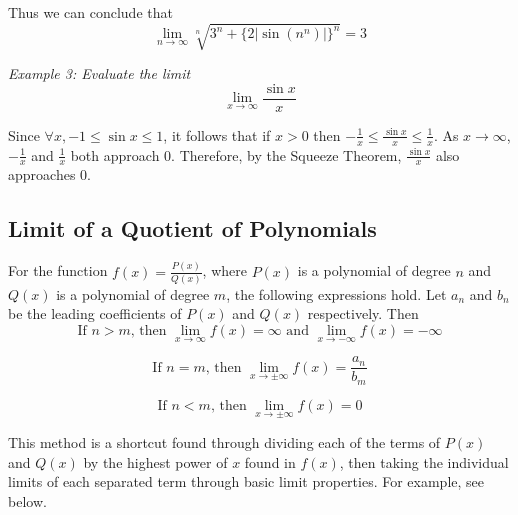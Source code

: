         \noindent Thus we can conclude that \\

        \begin{equation*}
            \lim_{n\to\infty} \sqrt[n]{3^n+\{2|\sin{(n^n)}|\}^n} = 3
        \end{equation*}

        \noindent \color{blue} \textit{Example 3: Evaluate the limit} \\
        \begin{equation*}
            \lim_{x\to\infty}\frac{\sin{x}}{x}
        \end{equation*} \color{black}

        \noindent Since $\forall x,-1\leq\sin{x}\leq1$, it follows that if $x>0$ then
        $-\frac{1}{x}\leq\frac{\sin{x}}{x}\leq\frac{1}{x}$. As $x\rightarrow\infty$,
        $-\frac{1}{x}$ and $\frac{1}{x}$ both approach 0. Therefore, by the Squeeze Theorem,
        $\frac{\sin{x}}{x}$ also approaches 0. \\



    \subsection{Limit of a Quotient of Polynomials}
        For the function $f(x)=\frac{P(x)}{Q(x)}$, where $P(x)$ is a polynomial of degree $n$
        and $Q(x)$ is a polynomial of degree $m$, the following expressions hold. Let $a_n$
        and $b_n$ be the leading coefficients of $P(x)$ and $Q(x)$ respectively. Then \\

        \begin{equation*}
            \text{If $n>m$, then }\lim_{x\to\infty}f(x)=\infty\text{ and }
            \lim_{x\to-\infty}f(x)=-\infty
        \end{equation*}

        \begin{equation*}
            \text{If $n=m$, then }\lim_{x\to\pm\infty}f(x)=\frac{a_n}{b_m}
        \end{equation*}

        \begin{equation*}
            \text{If $n<m$, then }\lim_{x\to\pm\infty}f(x)=0
        \end{equation*}

        \noindent This method is a shortcut found through dividing each of the terms of $P(x)$
        and $Q(x)$ by the highest power of $x$ found in $f(x)$, then taking the individual limits
        of each separated term through basic limit properties. For example, see below. \\

